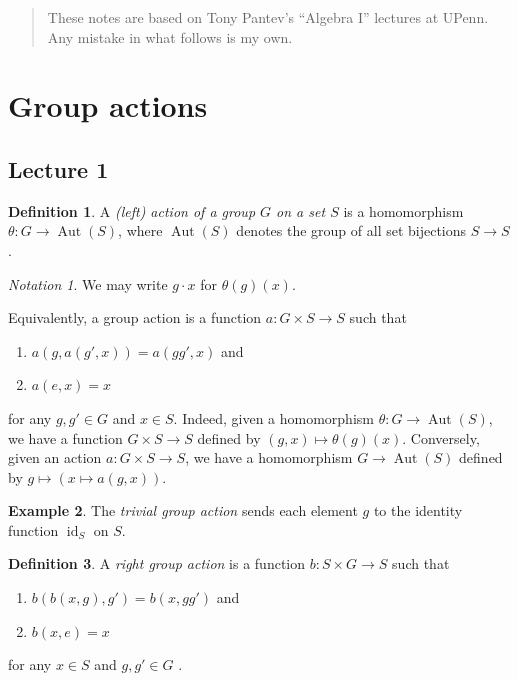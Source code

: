 \documentclass[10pt,letterpaper,cm]{nupset}
\theoremstyle{definition}
\newtheorem{definition}{Definition}[subsection]
\newtheorem{exmp}[definition]{Example}
\theoremstyle{theorem}
\theoremstyle{remark}
\newtheorem*{notation}{Notation}
\newcommand{\1}{\mathbf{1}}
\newcommand{\0}{\vec 0}
\DeclareMathOperator{\id}{\mathrm{id}}
\DeclareMathOperator{\aut}{Aut}
\begin{document}
\thispagestyle{empty}
\begin{abstract}
These notes are based on Tony Pantev's ``Algebra I'' lectures at UPenn. Any mistake in what follows is my own.
\end{abstract}

\tableofcontents
\newpage

\section{Group actions}

\subsection{Lecture 1}

\begin{definition} 
A \textit{(left) action of a group $G$ on a set $S$} is a homomorphism $\theta : G \to \aut(S)$, where $ \aut(S)$ denotes the group of all set bijections $S\to S$. 
\end{definition}

\begin{notation}
We may write $g\cdot x$ for $\theta(g)(x)$.
\end{notation}

\smallskip

Equivalently, a group action is a function $a : G \times S \to S$ such that 
\begin{enumerate}[label=(\roman*)]
\item $a(g, a(g', x)) = a(gg', x)$ and
\item $a(e, x) = x$
\end{enumerate}
for any $g,g' \in G$ and $x\in S$. 
Indeed, given a homomorphism $\theta : G \to \aut(S)$, we have a function $G\times S \to S$ defined by  $\left(g, x\right) \mapsto \theta(g)(x)$. Conversely, given an action $a : G\times S \to S$, we have a homomorphism $G \to \aut(S)$ defined by $g \mapsto \left(x \mapsto a(g, x)\right)$.


\begin{exmp}
The \textit{trivial group action} sends each element $g$ to the identity function $\id_S$ on $S$.
\end{exmp}


\begin{definition}
A \textit{right group action} is a function $b: S \times G \to S$ such that 
\begin{enumerate}[label=(\roman*)]
\item $b(b(x, g), g') = b(x, gg')$ and
\item $b(x, e) = x$
\end{enumerate}
for any $x\in S$ and $g,g' \in G$ . 
\end{definition}
\end{document}
